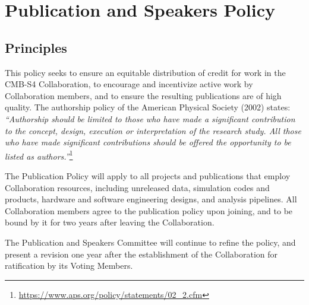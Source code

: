 \documentclass[12pt]{article}
\begin{document}


%


%

\section{Publication and Speakers Policy}
\label{sec:pub}
\subsection{Principles}
This policy seeks to ensure an equitable distribution of credit for work in the CMB-S4 Collaboration, to encourage and incentivize active work by Collaboration members, and to ensure the resulting publications are of high quality. The authorship policy of the American Physical Society (2002) states: \textit{``Authorship should be limited to those who have made a significant contribution to the concept, design, execution or interpretation of the research study. All those who have made significant contributions should be offered the opportunity to be listed as authors.''}\footnote{\url{https://www.aps.org/policy/statements/02_2.cfm}}

The Publication Policy will apply to all projects and publications that employ Collaboration resources, including unreleased data, simulation codes and products, hardware and software
engineering designs, and analysis pipelines. All Collaboration members agree to the publication policy upon joining, and to be bound by it for two years after leaving the Collaboration.

{\color{red} 
The Publication and Speakers Committee will continue to refine the policy, and present a revision one year after the establishment of the Collaboration for ratification by its Voting Members.
}
\end{document}
